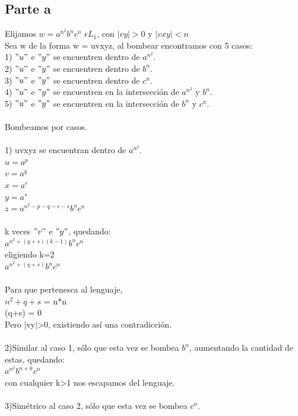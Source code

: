 \documentclass[11pt,letterpaper]{article}
\begin{document}
\subsection{Parte a}
Elijamos $w = a^{n^2}b^nc^n$ $\epsilon L_{1}$, con $|vy|>0$ y $|vxy|<n$ \\
Sea w de la forma w = uvxyz, al bombear encontramos con 5 casos: \\
1) $"u"$ e $"y"$ se encuentren dentro de $a^{n^2}$. \\
2) $"u"$ e $"y"$ se encuentren dentro de $b^n$. \\
3) $"u"$ e $"y"$ se encuentren dentro de $c^n$. \\
4) $"u"$ e $"y"$ se encuentren en la intersección de $a^{n^2}$ y $b^n$. \\
5) $"u"$ e $"y"$ se encuentren en la intersección de $b^n$ y $c^n$. \\
 \\
Bombeamos por casos. \\
 \\
1) uvxyz se encuentran dentro de $a^{n^2}$. \\
\indent $u=a^p$ \\
\indent $v=a^q$ \\
\indent $x=a^r$ \\
\indent $y=a^s$ \\
\indent $z=a^{n^2-p-q-r-s}b^nc^n$ \\
 \\
\indent k veces $"v"$ e $"y"$, quedando: \\
\indent $a^{n^2+(q+s)(k-1)}b^nc^n$ \\
\indent eligiendo k=2 \\
\indent $a^{n^2+(q+s)}b^nc^n$ \\
 \\
\indent Para que pertenesca al lenguaje, \\
\indent $n^2+q+s$ = n*n \\
\indent (q+s) = 0 \\
\indent Pero |vy|>0, existiendo así una contradicción. \\
 \\
2)Similar al caso 1, sólo que esta vez se bombea $b^n$, aumentando la cantidad de estas, quedando: \\
\indent $a^{n^2}b^{n+k}c^n$ \\
\indent con cualquier k>1 nos escapamos del lenguaje. \\
 \\
3)Simétrico al caso 2, sólo que esta vez se bombea $c^n$. \\
\end{document}
